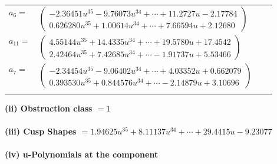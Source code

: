 \documentclass[1p]{elsarticle_modified}
\theoremstyle{definition}
\begin{document}
\begin{tabular}{m{7pt} m{180pt} m{7pt} m{180pt} }
\flushright $a_{6}=$&$\begin{pmatrix}-2.36451 u^{35}-9.76073 u^{34}+\cdots+11.2727 u-2.17784\\0.626280 u^{35}+1.00614 u^{34}+\cdots+7.66594 u+2.12680\end{pmatrix}$ \\
\flushright $a_{11}=$&$\begin{pmatrix}4.55144 u^{35}+14.4335 u^{34}+\cdots+19.5780 u+17.4542\\2.42464 u^{35}+7.42685 u^{34}+\cdots-1.91737 u+5.53466\end{pmatrix}$ \\
\flushright $a_{7}=$&$\begin{pmatrix}-2.34454 u^{35}-9.06402 u^{34}+\cdots+4.03352 u+0.662079\\0.393530 u^{35}+0.844576 u^{34}+\cdots-2.14879 u+3.10696\end{pmatrix}$\\&\end{tabular}
\flushleft \textbf{(ii) Obstruction class $= 1$}\\~\\
\flushleft \textbf{(iii) Cusp Shapes $= 1.94625 u^{35}+8.11137 u^{34}+\cdots+29.4415 u-9.23077$}\\~\\
\newpage\renewcommand{\arraystretch}{1}
\flushleft \textbf{(iv) u-Polynomials at the component}\newline \\
\end{document}
